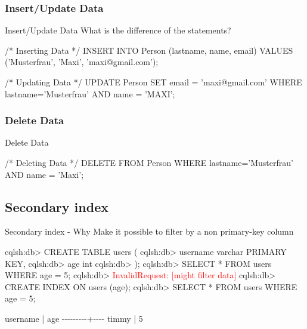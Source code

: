 \documentclass[
  10pt
]{beamer}
\begin{document}
\subsubsection{Insert/Update Data}
\begin{frame}[fragile]{Insert/Update Data \cite{cqlAlexMeng, newInCQL3}} %
  What is the difference of the statements?
  \begin{semiverbatim}
/* Inserting Data */
INSERT INTO Person (lastname, name, email)
VALUES ('Musterfrau', 'Maxi', 'maxi@gmail.com');

/* Updating Data */
UPDATE Person SET email = 'maxi@gmail.com'
WHERE lastname='Musterfrau' AND name = 'MAXI';
  \end{semiverbatim}
\end{frame}

\subsubsection{Delete Data}
\begin{frame}[fragile]{Delete Data \cite{cqlAlexMeng}}
  \begin{semiverbatim}
/* Deleting Data */
DELETE FROM Person
  WHERE lastname='Musterfrau' AND name = 'Maxi';
  \end{semiverbatim}
\end{frame}

\subsection{Secondary index}  %

\begin{frame}[fragile]{Secondary index - Why}
  Make it possible to filter by a non primary-key column
  \begin{semiverbatim}
  cqlsh:db> CREATE TABLE users (
  cqlsh:db>  username varchar PRIMARY KEY,
  cqlsh:db>  age int
  cqlsh:db> );
  cqlsh:db> SELECT * FROM users WHERE age = 5;
  cqlsh:db> \textcolor{red}{InvalidRequest: [might filter data]}
  cqlsh:db> CREATE INDEX ON users (age);
  cqlsh:db> SELECT * FROM users WHERE age = 5;

   username | age
   \--\--\--\--\--\--\--\--\--+\--\--\--\--
      timmy |   5
  \end{semiverbatim}
\end{frame}
\end{document}
